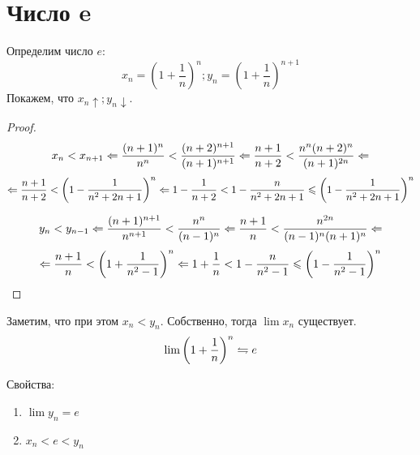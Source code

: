 ﻿\section{Число e}

Определим число $e$:
$$x_n = \left(1+\frac1n\right)^n; y_n=\left(1+\frac1n\right)^{n+1}$$
Покажем, что $x_n \uparrow; y_n \downarrow$.
\begin{proof}
$$x_n < x_{n+1} \Leftarrow \frac{(n+1)^n}{n^n} < \frac{(n+2)^{n+1}}{(n+1)^{n+1}} \Leftarrow \frac{n+1}{n+2} < \frac{n^n(n+2)^n}{(n+1)^{2n}} \Leftarrow $$
$$ \Leftarrow \frac{n+1}{n+2} < \left(1-\frac1{n^2+2n+1}\right)^n \Leftarrow 1 - \frac{1}{n+2} < 1 - \frac{n}{n^2+2n+1} \leqslant \left(1-\frac1{n^2+2n+1}\right)^n$$

$$y_n < y_{n-1} \Leftarrow \frac{(n+1)^{n+1}}{n^{n+1}} < \frac{n^n}{(n-1)^n} \Leftarrow \frac{n+1}{n} < \frac{n^{2n}}{(n-1)^n(n+1)^n} \Leftarrow $$
$$\Leftarrow \frac{n+1}{n} < \left(1+\frac1{n^2-1}\right)^n \Leftarrow 1 + \frac1n < 1 - \frac{n}{n^2-1} \leqslant \left(1-\frac1{n^2-1}\right)^n$$
\end{proof}

Заметим, что при этом $x_n < y_n$. Собственно, тогда $\lim x_n$ существует.
$$\lim \left(1+\frac1n\right)^n \leftrightharpoons e$$

Свойства:
\begin{enumerate}
\item $\lim y_n = e$
\item $x_n < e < y_n$
\end{enumerate}